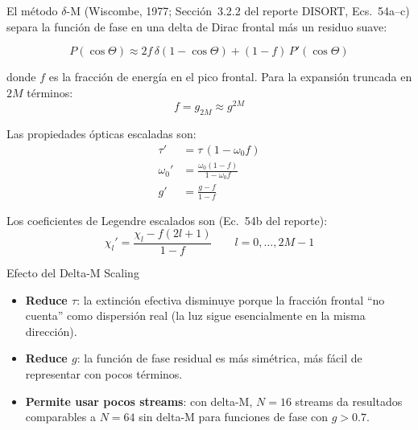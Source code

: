 \documentclass[a4paper,11pt]{article}
\begin{document}
El m\'etodo $\delta$-M (Wiscombe, 1977; Secci\'on~3.2.2 del reporte DISORT,
Ecs.~54a--c) separa la funci\'on de fase en una delta de Dirac frontal
m\'as un residuo suave:

\begin{equation}
    P(\cos\Theta) \approx 2f\,\delta(1-\cos\Theta) + (1-f)\,P'(\cos\Theta)
\end{equation}

donde $f$ es la fracci\'on de energ\'ia en el pico frontal.  Para la
expansi\'on truncada en $2M$ t\'erminos:
\begin{equation}
    f = g_{2M} \approx g^{2M}
\end{equation}

Las propiedades \'opticas escaladas son:
\begin{equation}\label{eq:delta_m_scaling}
    \boxed{
    \begin{aligned}
        \tau' &= \tau\,(1 - \omega_0 f) \\
        \omega_0' &= \frac{\omega_0(1-f)}{1-\omega_0 f} \\
        g' &= \frac{g - f}{1 - f}
    \end{aligned}
    }
\end{equation}

Los coeficientes de Legendre escalados son (Ec.~54b del reporte):
\begin{equation}
    \chi_l' = \frac{\chi_l - f(2l+1)}{1 - f} \qquad l = 0,\ldots,2M-1
\end{equation}

\begin{physics}{Efecto del Delta-M Scaling}
\begin{itemize}
    \item \textbf{Reduce $\tau$}: la extinci\'on efectiva disminuye porque la
          fracci\'on frontal ``no cuenta'' como dispersi\'on real (la luz sigue
          esencialmente en la misma direcci\'on).
    \item \textbf{Reduce $g$}: la funci\'on de fase residual es m\'as sim\'etrica,
          m\'as f\'acil de representar con pocos t\'erminos.
    \item \textbf{Permite usar pocos streams}: con delta-M, $N=16$ streams da
          resultados comparables a $N=64$ sin delta-M para funciones de fase
          con $g > 0.7$.
\end{itemize}
\end{physics}

\end{document}
